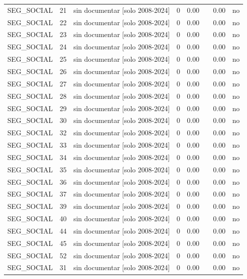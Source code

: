 \begin{tabular}{lllrrrrr}
SEG\_SOCIAL & 21 & sin documentar  [solo 2008-2024] & 0 & 0.00 &  & 0.00 & no \\
SEG\_SOCIAL & 22 & sin documentar  [solo 2008-2024] & 0 & 0.00 &  & 0.00 & no \\
SEG\_SOCIAL & 23 & sin documentar  [solo 2008-2024] & 0 & 0.00 &  & 0.00 & no \\
SEG\_SOCIAL & 24 & sin documentar  [solo 2008-2024] & 0 & 0.00 &  & 0.00 & no \\
SEG\_SOCIAL & 25 & sin documentar  [solo 2008-2024] & 0 & 0.00 &  & 0.00 & no \\
SEG\_SOCIAL & 26 & sin documentar  [solo 2008-2024] & 0 & 0.00 &  & 0.00 & no \\
SEG\_SOCIAL & 27 & sin documentar  [solo 2008-2024] & 0 & 0.00 &  & 0.00 & no \\
SEG\_SOCIAL & 28 & sin documentar  [solo 2008-2024] & 0 & 0.00 &  & 0.00 & no \\
SEG\_SOCIAL & 29 & sin documentar  [solo 2008-2024] & 0 & 0.00 &  & 0.00 & no \\
SEG\_SOCIAL & 30 & sin documentar  [solo 2008-2024] & 0 & 0.00 &  & 0.00 & no \\
SEG\_SOCIAL & 32 & sin documentar  [solo 2008-2024] & 0 & 0.00 &  & 0.00 & no \\
SEG\_SOCIAL & 33 & sin documentar  [solo 2008-2024] & 0 & 0.00 &  & 0.00 & no \\
SEG\_SOCIAL & 34 & sin documentar  [solo 2008-2024] & 0 & 0.00 &  & 0.00 & no \\
SEG\_SOCIAL & 35 & sin documentar  [solo 2008-2024] & 0 & 0.00 &  & 0.00 & no \\
SEG\_SOCIAL & 36 & sin documentar  [solo 2008-2024] & 0 & 0.00 &  & 0.00 & no \\
SEG\_SOCIAL & 37 & sin documentar  [solo 2008-2024] & 0 & 0.00 &  & 0.00 & no \\
SEG\_SOCIAL & 39 & sin documentar  [solo 2008-2024] & 0 & 0.00 &  & 0.00 & no \\
SEG\_SOCIAL & 40 & sin documentar  [solo 2008-2024] & 0 & 0.00 &  & 0.00 & no \\
SEG\_SOCIAL & 44 & sin documentar  [solo 2008-2024] & 0 & 0.00 &  & 0.00 & no \\
SEG\_SOCIAL & 45 & sin documentar  [solo 2008-2024] & 0 & 0.00 &  & 0.00 & no \\
SEG\_SOCIAL & 52 & sin documentar  [solo 2008-2024] & 0 & 0.00 &  & 0.00 & no \\
SEG\_SOCIAL & 31 & sin documentar  [solo 2008-2024] & 0 & 0.00 &  & 0.00 & no \\

\end{tabular}

